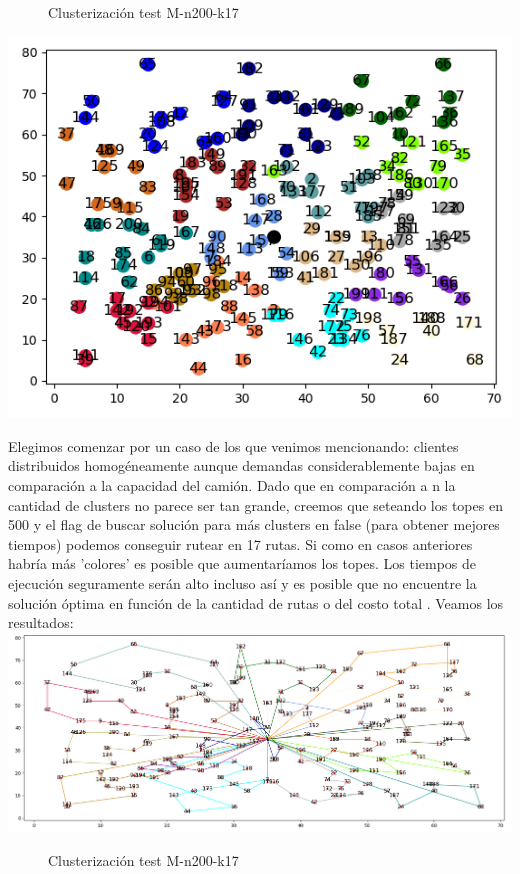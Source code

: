 \documentclass[11pt,a4paper]{article}
\begin{document}
\bigskip
\begin{figure}[!h]
\caption{Clusterización test M-n200-k17}
\end{figure}
\includegraphics[scale=.5]{graficos/M-n200-k17/cluster.png}

Elegimos comenzar por un caso de los que venimos mencionando: clientes distribuidos homogéneamente aunque demandas considerablemente bajas en comparación a la capacidad del camión. Dado que en comparación a n la cantidad de clusters no parece ser tan grande, creemos que seteando los topes en 500 y el flag de buscar solución para más clusters en false (para obtener mejores tiempos) podemos conseguir rutear en 17 rutas. Si como en casos anteriores habría más 'colores' es posible que aumentaríamos los topes. Los tiempos de ejecución seguramente serán alto incluso así y es posible que no encuentre la solución óptima en función de la cantidad de rutas o del costo total . Veamos los resultados:
\bigskip
\includegraphics[scale=.4]{graficos/M-n200-k17/caminos.png}
\begin{figure}[!h]
\caption{Clusterización test M-n200-k17}
\end{figure}
\end{document}
